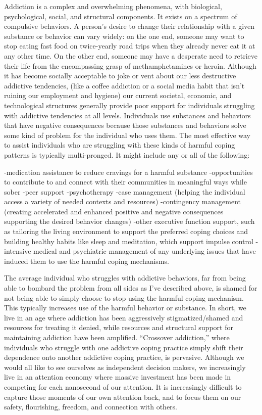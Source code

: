 \documentclass[12pt,letterpaper]{article}
\begin{document}
Addiction is a complex and overwhelming phenomena, with biological, psychological, social, and structural components. It exists on a spectrum of compulsive behaviors. A person's desire to change their relationship with a given substance or behavior can vary widely: on the one end, someone may want to stop eating fast food on twice-yearly road trips when they already never eat it at any other time. On the other end, someone may have a desperate need to retrieve their life from the encompassing grasp of methamphetamines or heroin. Although it has become socially acceptable to joke or vent about our less destructive addictive tendencies, (like a coffee addiction or a social media habit that isn't ruining our employment and hygiene) our current societal, economic, and technological structures generally provide poor support for individuals struggling with addictive tendencies at all levels. Individuals use substances and behaviors that have negative consequences because those substances and behaviors solve some kind of problem for the individual who uses them. The most effective way to assist individuals who are struggling with these kinds of harmful coping patterns is typically multi-pronged. It might include any or all of the following:

-medication assistance to reduce cravings for a harmful substance
-opportunities to contribute to and connect with their communities in meaningful ways while sober
-peer support
-psychotherapy
-case management (helping the individual access a variety of needed contexts and resources)
-contingency management (creating accelerated and enhanced positive and negative consequences supporting the desired behavior changes) 
-other executive function support, such as tailoring the living environment to support the preferred coping choices and building healthy habits like sleep and meditation, which support impulse control
-intensive medical and psychiatric management of any underlying issues that have induced them to use the harmful coping mechanisms.

The average individual who struggles with addictive behaviors, far from being able to bombard the problem from all sides as I've described above, is shamed for not being able to simply choose to stop using the harmful coping mechanism. This typically increases use of the harmful behavior or substance. In short, we live in an age where addiction has been aggressively stigmatized/shamed and resources for treating it denied, while resources and structural support for maintaining addiction have been amplified. “Crossover addiction,” where individuals who struggle with one addictive coping practice simply shift their dependence onto another addictive coping practice, is pervasive. Although we would all like to see ourselves as independent decision makers, we increasingly live in an attention economy where massive investment has been made in competing for each nanosecond of our attention. It is increasingly difficult to capture those moments of our own attention back, and to focus them on our safety, flourishing, freedom, and connection with others.
\end{document}
